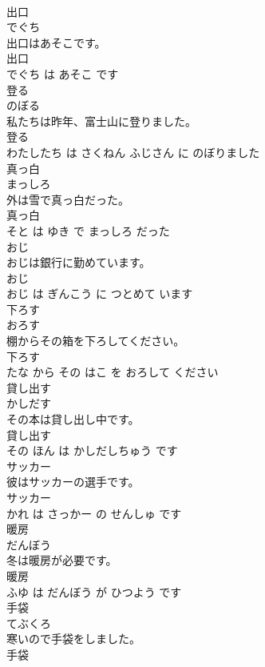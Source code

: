 \documentclass[8pt]{extreport}
\begin{document}
\begin{CJK}{UTF8}{min}
\\	出口	
\\	でぐち			
\\	出口はあそこです。	
\\	出口 
\\	でぐち は あそこ です			
\\	登る	
\\	のぼる			
\\	私たちは昨年、富士山に登りました。	
\\	登る 
\\	わたしたち は さくねん ふじさん に のぼりました			
\\	真っ白	
\\	まっしろ			
\\	外は雪で真っ白だった。	
\\	真っ白 
\\	そと は ゆき で まっしろ だった			
\\	おじ	
\\	おじは銀行に勤めています。	
\\	おじ 
\\	おじ は ぎんこう に つとめて います			
\\	下ろす	
\\	おろす			
\\	棚からその箱を下ろしてください。	
\\	下ろす 
\\	たな から その はこ を おろして ください			
\\	貸し出す	
\\	かしだす			
\\	その本は貸し出し中です。	
\\	貸し出す 
\\	その ほん は かしだしちゅう です			
\\	サッカー	
\\	彼はサッカーの選手です。	
\\	サッカー 
\\	かれ は さっかー の せんしゅ です			
\\	暖房	
\\	だんぼう			
\\	冬は暖房が必要です。	
\\	暖房 
\\	ふゆ は だんぼう が ひつよう です			
\\	手袋	
\\	てぶくろ			
\\	寒いので手袋をしました。	
\\	手袋 

\end{CJK}
\end{document}
